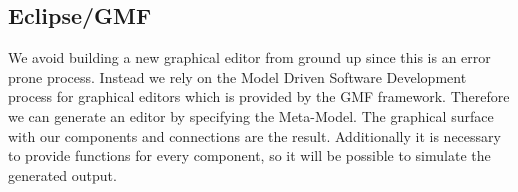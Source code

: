 	  \subsection{Eclipse/GMF}
		We avoid building a new graphical editor from ground up since this is an error prone process. Instead we rely on the Model Driven Software Development process for graphical editors which is provided by the GMF framework. Therefore we can generate an editor by specifying the Meta-Model. The graphical surface with our components and connections are the result. Additionally it is necessary to provide functions for every component, so it will be possible to simulate the generated output.
      